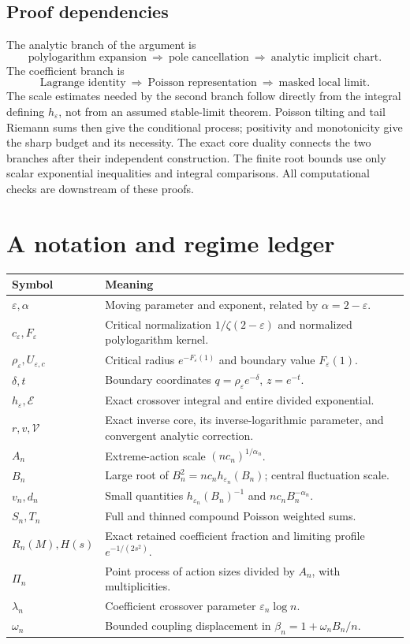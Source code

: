 \documentclass[11pt,a4paper]{article}
\numberwithin{equation}{section}
\theoremstyle{definition}
\theoremstyle{remark}
\newcommand{\eps}{\varepsilon}
\newcommand{\cE}{\mathcal E}
\newcommand{\cV}{\mathcal V}
\begin{document}
\subsection{Proof dependencies}
The analytic branch of the argument is
\[
 \text{polylogarithm expansion}
 \ \Longrightarrow\ \text{pole cancellation}
 \ \Longrightarrow\ \text{analytic implicit chart}.
\]
The coefficient branch is
\[
 \text{Lagrange identity}
 \ \Longrightarrow\ \text{Poisson representation}
 \ \Longrightarrow\ \text{masked local limit}.
\]
The scale estimates needed by the second branch follow directly from the
integral defining \(h_\eps\), not from an assumed stable-limit theorem.
Poisson tilting and tail Riemann sums then give the conditional process;
positivity and monotonicity give the sharp budget and its necessity.
The exact core duality connects the two branches after their independent
construction. The finite root bounds use only scalar exponential inequalities
and integral comparisons. All computational checks are downstream of these
proofs.

\section{A notation and regime ledger}
\small
\begin{longtable}{@{}p{}p{}@{}}
\toprule
Symbol & Meaning\\
\midrule
\endhead
\(\eps,\alpha\) & Moving parameter and exponent, related by \(\alpha=2-\eps\).\\[1pt]
\(c_\eps,F_\eps\) & Critical normalization \(1/\zeta(2-\eps)\) and normalized polylogarithm kernel.\\[1pt]
\(\rho_\eps,U_{\eps,c}\) & Critical radius \(e^{-F_\eps(1)}\) and boundary value \(F_\eps(1)\).\\[1pt]
\(\delta,t\) & Boundary coordinates \(q=\rho_\eps e^{-\delta}\), \(z=e^{-t}\).\\[1pt]
\(h_\eps,\cE\) & Exact crossover integral and entire divided exponential.\\[1pt]
\(r,v,\cV\) & Exact inverse core, its inverse-logarithmic parameter, and convergent analytic correction.\\[1pt]
\(A_n\) & Extreme-action scale \((nc_n)^{1/\alpha_n}\).\\[1pt]
\(B_n\) & Large root of \(B_n^2=nc_nh_{\eps_n}(B_n)\); central fluctuation scale.\\[1pt]
\(v_n,d_n\) & Small quantities \(h_{\eps_n}(B_n)^{-1}\) and \(nc_nB_n^{-\alpha_n}\).\\[1pt]
\(S_n,T_n\) & Full and thinned compound Poisson weighted sums.\\[1pt]
\(R_n(M),H(s)\) & Exact retained coefficient fraction and limiting profile \(e^{-1/(2s^2)}\).\\[1pt]
\(\Pi_n\) & Point process of action sizes divided by \(A_n\), with multiplicities.\\[1pt]
\(\lambda_n\) & Coefficient crossover parameter \(\eps_n\log n\).\\[1pt]
\(\omega_n\) & Bounded coupling displacement in \(\beta_n=1+\omega_nB_n/n\).\\
\bottomrule
\end{longtable}
\normalsize
\end{document}
